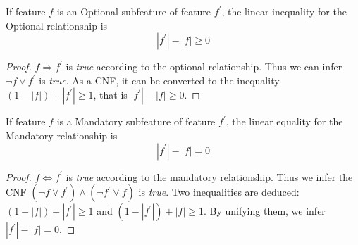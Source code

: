 
\begin{lem}\label{lem:optional}If feature $f$ is an Optional subfeature  of feature $f^\prime$, the linear inequality for the Optional relationship is
  \begin{equation}
  |f^\prime| - |f| \ge 0
  \end{equation}
  \end{lem}
\begin{proof}
  $f \Rightarrow f^\prime$  is \emph{true} according to the optional relationship. Thus we can infer $\neg f  \lor f^\prime$  is \emph{true}. As a CNF, it can be converted to the inequality $(1-|f|)+|f^\prime| \ge 1$, that is $  |f^\prime| - |f| \ge 0$.
\end{proof}

\vspace{-3mm}
\begin{lem}\label{lem:mandatory}
If feature $f$ is a Mandatory subfeature  of feature $f^\prime$, the linear equality for the Mandatory relationship is
  \begin{equation}
  |f^\prime| - |f| = 0
  \end{equation}
\end{lem}
\begin{proof}
  $f \Leftrightarrow f^\prime$ is \emph{true} according to the mandatory relationship. Thus we infer the CNF $ (\neg f  \lor f^\prime) \land ( \neg  f^\prime \lor  f)$  is \emph{true}. Two inequalities are deduced:  $(1-|f|)+|f^\prime| \ge 1$ and $(1-|f^\prime| )+ |f|\ge 1$. By unifying them, we infer $|f^\prime| - |f| = 0$.
\end{proof}

